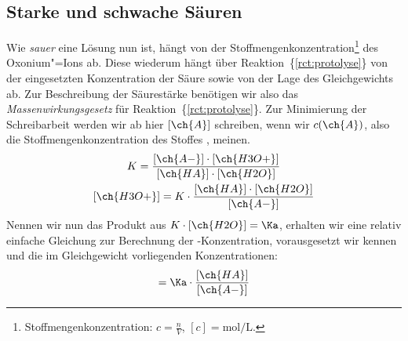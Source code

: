 \documentclass{arbeitsblatt}
\newcommand*\rctref[1]{\{\ref{#1}\}}
\begin{document}
\subsection{Starke und schwache Säuren}
Wie \emph{sauer} eine Lösung nun ist, hängt von der
Stoffmengenkonzentration\footnote{Stoffmengenkonzentration: $c=\frac{n}{V}$,
  $[c]=\si{\mole\per\liter}$.} des Oxonium"=Ions ab.  Diese wiederum hängt
über Reaktion~\rctref{rct:protolyse} von der eingesetzten Konzentration der
Säure sowie von der Lage des Gleichgewichts ab.  Zur Beschreibung der
Säurestärke benötigen wir also das \emph{Massenwirkungsgesetz} für
Reaktion~\rctref{rct:protolyse}.  Zur Minimierung der Schreibarbeit werden wir
ab hier $[\ch{A}]$ schreiben, wenn wir $c(\ch{A})$, also die
Stoffmengenkonzentration des Stoffes , meinen.
\begin{gather}
  K =
    \frac
      { [\ch{A-}] \cdot [\ch{H3O+}] }
      { [\ch{HA}] \cdot [\ch{H2O}] } \label{eq:protolyse_mwg} \\
  [\ch{H3O+}] =
    K \cdot \frac{ [\ch{HA}] \cdot [\ch{H2O}] }{ [\ch{A-}] }
\end{gather}
Nennen wir nun das Produkt aus $K \cdot [\ch{H2O}] = \Ka$, erhalten wir eine
relativ einfache Gleichung zur Berechnung der -Konzentration,
vorausgesetzt wir kennen \Ka und die im Gleichgewicht vorliegenden
Konzentrationen:
\begin{equation}
  [\ch{H3O+}] = \Ka \cdot \frac{ [\ch{HA}] }{ [\ch{A-}] } \label{eq:cHtO_aus_Ks}
\end{equation}
\end{document}
